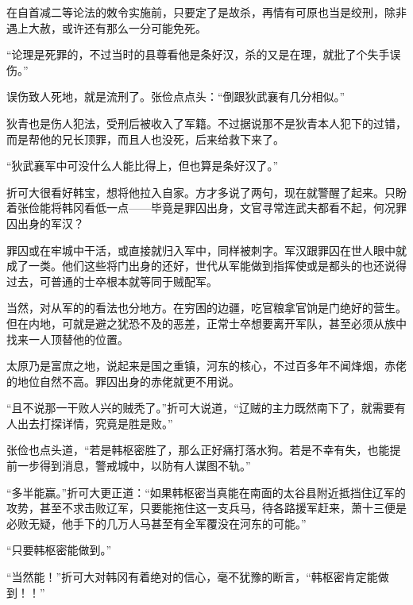 在自首减二等论法的敇令实施前，只要定了是故杀，再情有可原也当是绞刑，除非遇上大赦，或许还有那么一分可能免死。

“论理是死罪的，不过当时的县尊看他是条好汉，杀的又是在理，就批了个失手误伤。”

误伤致人死地，就是流刑了。张俭点点头：“倒跟狄武襄有几分相似。”

狄青也是伤人犯法，受刑后被收入了军籍。不过据说那不是狄青本人犯下的过错，而是帮他的兄长顶罪，而且人也没死，后来给救下来了。

“狄武襄军中可没什么人能比得上，但也算是条好汉了。”

折可大很看好韩宝，想将他拉入自家。方才多说了两句，现在就警醒了起来。只盼着张俭能将韩冈看低一点——毕竟是罪囚出身，文官寻常连武夫都看不起，何况罪囚出身的军汉？

罪囚或在牢城中干活，或直接就归入军中，同样被刺字。军汉跟罪囚在世人眼中就成了一类。他们这些将门出身的还好，世代从军能做到指挥使或是都头的也还说得过去，可普通的士卒根本就等同于贼配军。

当然，对从军的的看法也分地方。在穷困的边疆，吃官粮拿官饷是门绝好的营生。但在内地，可就是避之犹恐不及的恶差，正常士卒想要离开军队，甚至必须从族中找来一人顶替他的位置。

太原乃是富庶之地，说起来是国之重镇，河东的核心，不过百多年不闻烽烟，赤佬的地位自然不高。罪囚出身的赤佬就更不用说。

“且不说那一干败人兴的贼秃了。”折可大说道，“辽贼的主力既然南下了，就需要有人出去打探详情，究竟是胜是败。”

张俭也点头道，“若是韩枢密胜了，那么正好痛打落水狗。若是不幸有失，也能提前一步得到消息，警戒城中，以防有人谋图不轨。”

“多半能赢。”折可大更正道：“如果韩枢密当真能在南面的太谷县附近抵挡住辽军的攻势，甚至不求击败辽军，只要能拖住这一支兵马，待各路援军赶来，萧十三便是必败无疑，他手下的几万人马甚至有全军覆没在河东的可能。”

“只要韩枢密能做到。”

“当然能！”折可大对韩冈有着绝对的信心，毫不犹豫的断言，“韩枢密肯定能做到！！”
